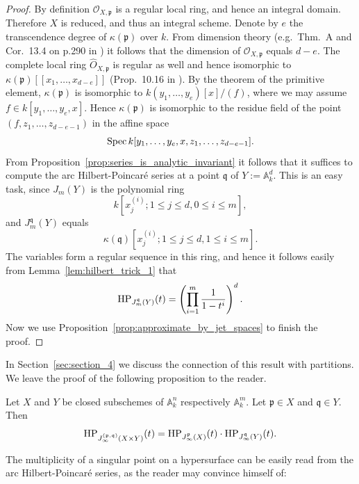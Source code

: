 \begin{proof}
By definition $\mathcal{O}_{X,\mathfrak{p}}$ is a regular local ring, and hence an integral domain. Therefore $X$ is reduced, and thus an integral scheme.
Denote by $e$ the transcendence degree of $\kappa(\mathfrak{p})$ over $k$. From dimension theory (e.g.\ Thm.\ A and Cor.\ 13.4 on p.290 in \cite{eisenbud_commalg}) it follows that the dimension of $\mathcal{O}_{X,\mathfrak{p}}$ equals $d-e$. The complete local ring $\widehat{O}_{X,\mathfrak{p}}$ is regular as well and hence isomorphic to $\kappa(\mathfrak{p})[[x_1,\ldots , x_{d-e}]]$ (Prop.\ 10.16 in \cite{eisenbud_commalg}). By the theorem of the primitive element, $\kappa(\mathfrak{p})$ is isomorphic to $k(y_1,\ldots,y_e)[x]/(f)$, where we may assume $f\in k[y_1,\ldots,y_e,x]$. Hence $\kappa(\mathfrak{p})$ is isomorphic to the residue field of the point $(f,z_1,\ldots , z_{d-e-1})$ in the affine space 
\[ \operatorname{Spec} k[y_1,\ldots,y_e,x,z_1,\ldots, z_{d-e-1}].     \]
From Proposition~\ref{prop:series_is_analytic_invariant} it follows that it suffices to compute the arc Hilbert-Poincar\'{e} series at a point $\mathfrak{q}$ of $Y:=\mathbb{A}^{d}_{k}$. This is an easy task, since $J_{m}(Y)$ is the polynomial ring
\[ k[x_j^{(i)}; 1\leq j \leq d, 0\leq i\leq m],\] 
and $J_{m}^{\mathfrak{q}}(Y)$ equals
\[ \kappa(\mathfrak{q})[x_j^{(i)}; 1\leq j \leq d, 1\leq i\leq m].\] 
The variables form a regular sequence in this ring, and hence it follows easily from Lemma~\ref{lem:hilbert_trick_1} that
\[ \operatorname{HP}_{J_{m}^{\mathfrak{q}}(Y)}(t) = \left(\prod_{i=1}^m \frac{1}{1-t^i} \right)^{d}.\]
Now we use Proposition~\ref{prop:approximate_by_jet_spaces} to finish the proof.
\end{proof}

In Section~\ref{sec:section_4} we discuss the connection of this result with partitions. We leave the proof of the following proposition to the reader.

\begin{Prop}\label{prop:multiplicativity_for_products}
Let $X$ and $Y$ be closed subschemes of $\mathbb{A}^n_k$ respectively $\mathbb{A}^m_k$. Let $\mathfrak{p}\in X$ and $\mathfrak{q}\in Y$. Then
\[ \operatorname{HP}_{J_{\infty}^{(\mathfrak{p},\mathfrak{q})}(X\times Y)}(t) = \operatorname{HP}_{J_{\infty}^{\mathfrak{p}}(X)}(t)\cdot \operatorname{HP}_{J_{\infty}^{\mathfrak{q}}(Y)}(t).  \]
\end{Prop}

The multiplicity of a singular point on a hypersurface can be easily read from the arc Hilbert-Poincar\'{e} series, as the reader may convince himself of:

